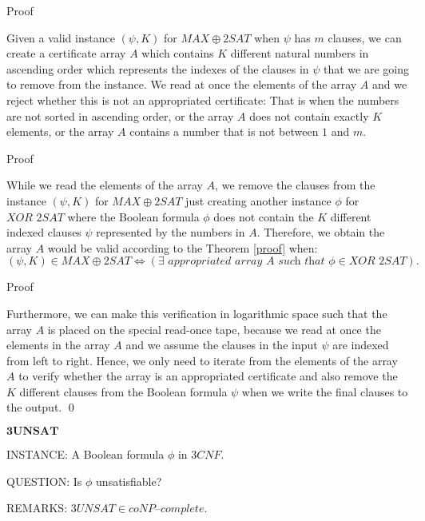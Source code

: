 \documentclass[11pt]{beamer}
\begin{document}
\begin{frame}{Proof}

Given a valid instance $(\psi, K)$ for $MAX\oplus2SAT$ when $\psi$ has $m$ clauses, we can create a certificate array $A$ which contains $K$ different natural numbers in ascending order which represents the indexes of the clauses in $\psi$ that we are going to remove from the instance. We read at once the elements of the array $A$ and we reject whether this is not an appropriated certificate: That is when the numbers are not sorted in ascending order, or the array $A$ does not contain exactly $K$ elements, or the array $A$ contains a number that is not between $1$ and $m$.

\end{frame}

\begin{frame}{Proof}

While we read the elements of the array $A$, we remove the clauses from the instance $(\psi, K)$ for $MAX\oplus2SAT$ just creating another instance $\phi$ for $\textit{XOR 2SAT}$ where the Boolean formula $\phi$ does not contain the $K$ different indexed clauses $\psi$ represented by the numbers in $A$. Therefore, we obtain the array $A$ would be valid according to the Theorem \ref{proof} when:
\[(\psi, K) \in MAX\oplus2SAT \Leftrightarrow (\exists \textit{ appropriated array } A \textit{ such that } \phi \in \textit{XOR 2SAT}).\]

\end{frame}

\begin{frame}{Proof}

Furthermore, we can make this verification in logarithmic space such that the array $A$ is placed on the special read-once tape, because we read at once the elements in the array $A$ and we assume the clauses in the input $\psi$ are indexed from left to right. Hence, we only need to iterate from the elements of the array $A$ to verify whether the array is an appropriated certificate and also remove the $K$ different clauses from the Boolean formula $\psi$ when we write the final clauses to the output.  \qed

\end{frame}

\begin{frame}{$\textbf{3UNSAT}$}

\begin{definition}
INSTANCE: A Boolean formula $\phi$ in $3CNF$.

QUESTION: Is $\phi$ unsatisfiable?

REMARKS: $3UNSAT \in \textit{coNP--complete}$.
\end{definition}

\end{frame}
\end{document}
